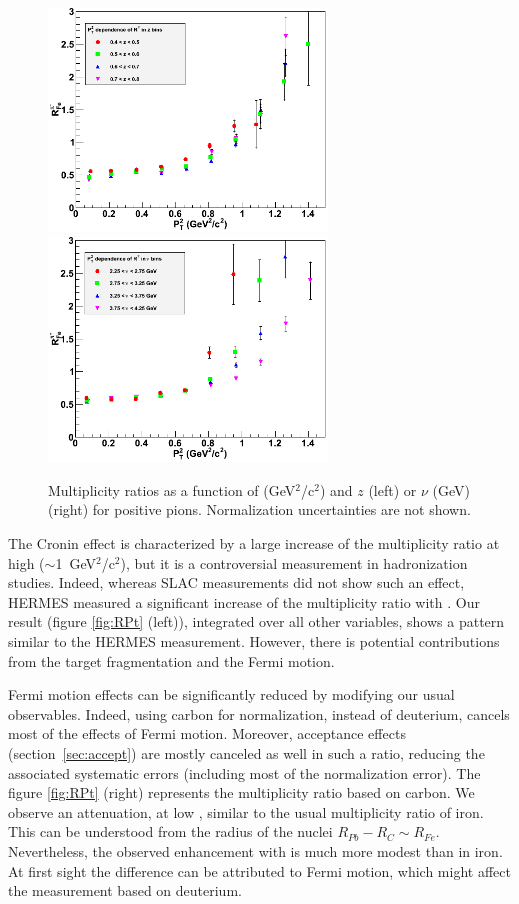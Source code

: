 \begin{figure}[p]
\centering
\includegraphics[width=7.4cm] {chap6-fig/F_RvPtinZ.png} 
\includegraphics[width=7.4cm] {chap6-fig/F_RvPtinNu.png} 
\caption {Multiplicity ratios as a function of \pt (GeV$^2$/c$^2$) and $z$ (left) 
or $\nu$ (GeV) (right) for positive pions. Normalization uncertainties are not shown.}
\label{fig:RPtMulti}
\end{figure}

The Cronin effect is characterized by a large increase of the multiplicity 
ratio at high \pt ($\sim$1~GeV$^2$/c$^2$), but it is a controversial 
measurement in hadronization studies. Indeed, whereas SLAC measurements 
\cite{Osborne:1978ai} did not show such an effect, HERMES 
\cite{Airapetian:2007vu} measured a significant increase of the multiplicity 
ratio with \ptp. Our result (figure \ref{fig:RPt} (left)), integrated over 
all other variables, shows a pattern similar to the HERMES measurement. 
However, there is potential contributions from the target fragmentation and 
the Fermi motion.

Fermi motion effects can be significantly reduced by modifying 
our usual observables. Indeed, using carbon for normalization, instead of deuterium, 
cancels most of the effects of Fermi motion. Moreover, acceptance 
effects (section~\ref{sec:accept}) are mostly canceled as well in such a ratio, 
reducing the associated systematic errors (including most of the normalization error). 
The figure \ref{fig:RPt} (right) represents the multiplicity ratio based on carbon. We 
observe an attenuation, at low \ptp, similar to the usual multiplicity ratio 
of iron. This can be understood from the radius of the nuclei $R_{Pb}-R_{C} 
\sim R_{Fe}$. Nevertheless, the observed enhancement with \pt is much more modest than in 
iron. At first sight the difference can be attributed to Fermi motion, which 
might affect the measurement based on deuterium.

